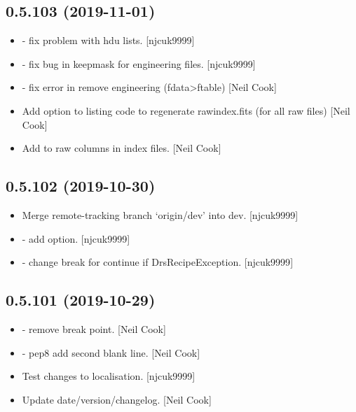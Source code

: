 \documentclass[a4paper,10pt,english]{report}
\begin{document}
\subsection{0.5.103 (2019-11-01)}
\label{\detokenize{misc/changelog:id40}}\begin{itemize}
\item {} 
 - fix problem with hdu lists. {[}njcuk9999{]}

\item {} 
 - fix bug in keepmask for
engineering files. {[}njcuk9999{]}

\item {} 
 - fix error in remove engineering (fdata\textendash{}\textgreater{}ftable)
{[}Neil Cook{]}

\item {} 
Add option to listing code to regenerate rawindex.fits (for all raw
files) {[}Neil Cook{]}

\item {} 
Add  to raw columns in index files. {[}Neil Cook{]}

\end{itemize}


\subsection{0.5.102 (2019-10-30)}
\label{\detokenize{misc/changelog:id41}}\begin{itemize}
\item {} 
Merge remote-tracking branch ‘origin/dev’ into dev. {[}njcuk9999{]}

\item {} 
 - add  option.
{[}njcuk9999{]}

\item {} 
 - change break for continue if
DrsRecipeException. {[}njcuk9999{]}

\end{itemize}


\subsection{0.5.101 (2019-10-29)}
\label{\detokenize{misc/changelog:id42}}\begin{itemize}
\item {} 
 - remove break point. {[}Neil Cook{]}

\item {} 
 - pep8 add second blank line. {[}Neil
Cook{]}

\item {} 
Test changes to localisation. {[}njcuk9999{]}

\item {} 
Update date/version/changelog. {[}Neil Cook{]}

\end{itemize}
\end{document}
